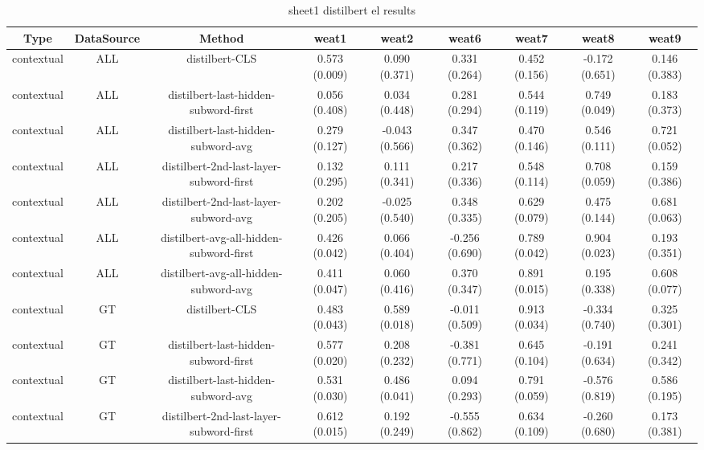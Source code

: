 \begin{sidewaystable}[htb]
    \centering
    \caption{sheet1 distilbert el results}
    \label{appendix_tab:sheet1_distilbert_el_results}
    \small
    \begin{tabular}{@{}ccccccccc@{}}
        \toprule
        Type & DataSource & Method & weat1 & weat2 & weat6 & weat7 & weat8 & weat9 \\
        \midrule
        contextual & ALL & distilbert-CLS & 0.573 (0.009) & 0.090 (0.371) & 0.331 (0.264) & 0.452 (0.156) & -0.172 (0.651) & 0.146 (0.383) \\
        contextual & ALL & distilbert-last-hidden-subword-first & 0.056 (0.408) & 0.034 (0.448) & 0.281 (0.294) & 0.544 (0.119) & 0.749 (0.049) & 0.183 (0.373) \\
        contextual & ALL & distilbert-last-hidden-subword-avg & 0.279 (0.127) & -0.043 (0.566) & 0.347 (0.362) & 0.470 (0.146) & 0.546 (0.111) & 0.721 (0.052) \\
        contextual & ALL & distilbert-2nd-last-layer-subword-first & 0.132 (0.295) & 0.111 (0.341) & 0.217 (0.336) & 0.548 (0.114) & 0.708 (0.059) & 0.159 (0.386) \\
        contextual & ALL & distilbert-2nd-last-layer-subword-avg & 0.202 (0.205) & -0.025 (0.540) & 0.348 (0.335) & 0.629 (0.079) & 0.475 (0.144) & 0.681 (0.063) \\
        contextual & ALL & distilbert-avg-all-hidden-subword-first & 0.426 (0.042) & 0.066 (0.404) & -0.256 (0.690) & 0.789 (0.042) & 0.904 (0.023) & 0.193 (0.351) \\
        contextual & ALL & distilbert-avg-all-hidden-subword-avg & 0.411 (0.047) & 0.060 (0.416) & 0.370 (0.347) & 0.891 (0.015) & 0.195 (0.338) & 0.608 (0.077) \\
        contextual & GT & distilbert-CLS & 0.483 (0.043) & 0.589 (0.018) & -0.011 (0.509) & 0.913 (0.034) & -0.334 (0.740) & 0.325 (0.301) \\
        contextual & GT & distilbert-last-hidden-subword-first & 0.577 (0.020) & 0.208 (0.232) & -0.381 (0.771) & 0.645 (0.104) & -0.191 (0.634) & 0.241 (0.342) \\
        contextual & GT & distilbert-last-hidden-subword-avg & 0.531 (0.030) & 0.486 (0.041) & 0.094 (0.293) & 0.791 (0.059) & -0.576 (0.819) & 0.586 (0.195) \\
        contextual & GT & distilbert-2nd-last-layer-subword-first & 0.612 (0.015) & 0.192 (0.249) & -0.555 (0.862) & 0.634 (0.109) & -0.260 (0.680) & 0.173 (0.381) \\

\end{tabular}
\end{sidewaystable}
